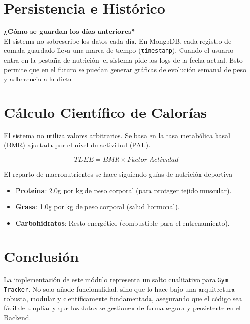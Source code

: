 \documentclass[12pt,a4paper]{article}
\begin{document}
\section{Persistencia e Histórico}
\textbf{¿Cómo se guardan los días anteriores?} \\
El sistema no sobrescribe los datos cada día. En MongoDB, cada registro de comida guardado lleva una marca de tiempo (\texttt{timestamp}). Cuando el usuario entra en la pestaña de nutrición, el sistema pide los logs de la fecha actual. Esto permite que en el futuro se puedan generar gráficas de evolución semanal de peso y adherencia a la dieta.

\section{Cálculo Científico de Calorías}
El sistema no utiliza valores arbitrarios. Se basa en la tasa metabólica basal (BMR) ajustada por el nivel de actividad (PAL).

\begin{equation}
TDEE = BMR \times Factor\_Actividad
\end{equation}

El reparto de macronutrientes se hace siguiendo guías de nutrición deportiva:
\begin{itemize}
    \item \textbf{Proteína}: 2.0g por kg de peso corporal (para proteger tejido muscular).
    \item \textbf{Grasa}: 1.0g por kg de peso corporal (salud hormonal).
    \item \textbf{Carbohidratos}: Resto energético (combustible para el entrenamiento).
\end{itemize}

\section{Conclusión}
La implementación de este módulo representa un salto cualitativo para \texttt{Gym Tracker}. No solo añade funcionalidad, sino que lo hace bajo una arquitectura robusta, modular y científicamente fundamentada, asegurando que el código sea fácil de ampliar y que los datos se gestionen de forma segura y persistente en el Backend.
\end{document}
